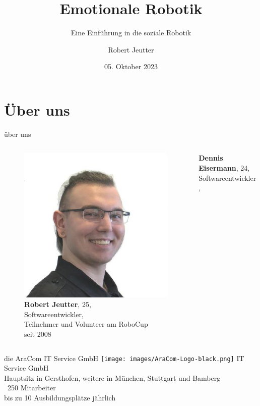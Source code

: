 \documentclass[aspectratio=169]{beamer}
\title{Emotionale Robotik}
\subtitle{Eine Einführung in die soziale Robotik}
\author{Robert Jeutter}
\date{05. Oktober 2023}
\begin{document}
\maketitle

\section{Über uns}
\begin{frame}{über uns}
  \begin{columns}
    \begin{column}{0.45\textwidth}
      \begin{figure}[h]
        \centering
        \includegraphics[width=.6\linewidth]{images/robert_jeutter.jpeg}\\
        \textbf{Robert Jeutter}, 25,\\
        Softwareentwickler,\\
        \scriptsize{Teilnehmer und Volunteer am RoboCup\\ seit 2008}
      \end{figure}
    \end{column}
    \begin{column}{0.45\textwidth}
      \textbf{Dennis Eisermann}, 24,\\ 
      Softwareentwickler,\\
    \end{column}
  \end{columns}
\end{frame}
\begin{frame}{die AraCom IT Service GmbH}
    \texttt{[image: images/AraCom-Logo-black.png]} 
    IT Service GmbH\\
    Hauptsitz in Gersthofen, weitere in München, Stuttgart und Bamberg\\
    ~250 Mitarbeiter\\
    bis zu 10 Ausbildungsplätze jährlich 
\end{frame}
\end{document}
